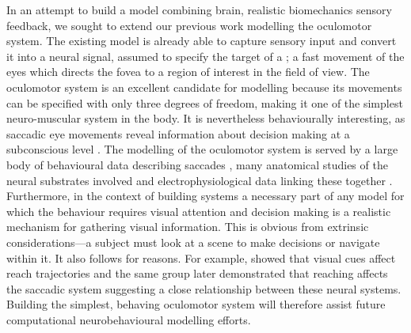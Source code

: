 In an attempt to build a model combining brain, realistic
biomechanics  sensory
feedback, we sought to extend our previous work modelling the oculomotor system.
The existing model \citep{cope_basal_2017} is already able to capture sensory input
and convert it into a neural signal, assumed to specify the target of a
;
a fast movement of the eyes which directs the fovea to a region of interest
in the field of view.
The oculomotor system is an excellent candidate for modelling because
its movements can  be specified with only three degrees of freedom,
making it one of the simplest neuro-muscular system in the body.
It is nevertheless behaviourally
interesting, as saccadic eye movements reveal information about decision making at
a subconscious level
\citep{deubel_saccade_1996,reppert_modulation_2015,marcos_determining_2016}.
The modelling of the oculomotor system is served by a large body of
behavioural data describing
saccades \citep{tipper_reaching_2001,walker_effect_1997,casteau_effect_2012},
many anatomical studies of the neural substrates involved
\citep{meredith_intrinsic_1998,isa_intrinsic_2002,isa_exploring_2009}
and electrophysiological data linking these together
\citep{hepp_spatio-temporal_1983,dorris_neuronal_1997,mcpeek_competition_2003,vokoun_circuit_2011}.
Furthermore, in the context
of building  systems a
necessary part of any model for which the behaviour requires visual attention
and decision making is a realistic mechanism for gathering visual information.
This is obvious from extrinsic considerations---a
subject must look at a scene to make decisions or navigate within it. It
also follows for  reasons. For example, \cite{howard_hand_1997}
showed that visual cues affect reach trajectories and the same group later
demonstrated that reaching affects the saccadic system
\citep{tipper_reaching_2001} suggesting a close relationship between these
neural systems. Building the simplest, behaving oculomotor system will
therefore assist future computational neurobehavioural modelling efforts.

